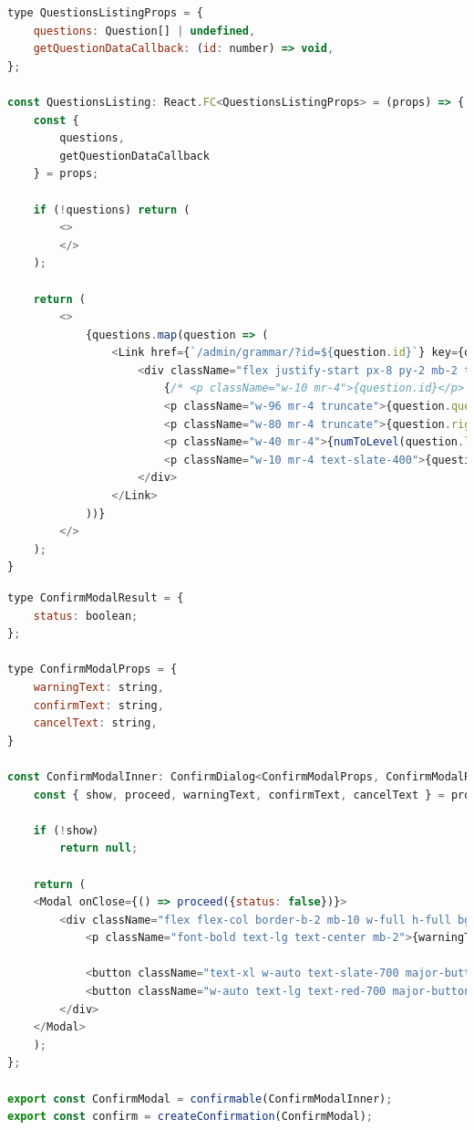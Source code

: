 \newpage
\begin{lstlisting}[language=JavaScript,caption={Úryvek z \M{/src/pages/admin/grammar/index.tsx}; generování seznamu otázek z databáze.}, label={xslxgen}]
type QuestionsListingProps = {
    questions: Question[] | undefined,
    getQuestionDataCallback: (id: number) => void,
};

const QuestionsListing: React.FC<QuestionsListingProps> = (props) => {
    const {
        questions,
        getQuestionDataCallback
    } = props;

    if (!questions) return (
        <>
        </>
    );

    return (
        <>
            {questions.map(question => (
                <Link href={`/admin/grammar/?id=${question.id}`} key={question.id} onClick={() => getQuestionDataCallback(question.id)}>
                    <div className="flex justify-start px-8 py-2 mb-2 text-left text-slate-700 hover:ring-2 ring-purple-600 rounded-3xl hover:cursor-pointer font-extrabold">
                        {/* <p className="w-10 mr-4">{question.id}</p> */}
                        <p className="w-96 mr-4 truncate">{question.questionText}</p>
                        <p className="w-80 mr-4 truncate">{question.rightAnswer}</p>
                        <p className="w-40 mr-4">{numToLevel(question.languageLevel)}</p>
                        <p className="w-10 mr-4 text-slate-400">{question.id}</p>
                    </div>
                </Link>
            ))}
        </>
    );
}
\end{lstlisting}

\pagebreak
\begin{lstlisting}[language=JavaScript,caption={Úryvek z \M{/src/components/admin/confirmModal.tsx}; potvrzovací modální okno.}, label={xslxgen}]
type ConfirmModalResult = {
    status: boolean;
};

type ConfirmModalProps = {
    warningText: string,
    confirmText: string,
    cancelText: string,
}

const ConfirmModalInner: ConfirmDialog<ConfirmModalProps, ConfirmModalResult> = (props) => {
    const { show, proceed, warningText, confirmText, cancelText } = props;

    if (!show)
        return null;

    return (
    <Modal onClose={() => proceed({status: false})}>
        <div className="flex flex-col border-b-2 mb-10 w-full h-full bg-purple-100 rounded-3xl p-10 px-14">
            <p className="font-bold text-lg text-center mb-2">{warningText}</p>

            <button className="text-xl w-auto text-slate-700 major-button my-3" onClick={() => proceed({status: false})}>{cancelText}</button>
            <button className="w-auto text-lg text-red-700 major-button" onClick={() => proceed({status: true})}>{confirmText}</button>
        </div>
    </Modal>
    );
};

export const ConfirmModal = confirmable(ConfirmModalInner);
export const confirm = createConfirmation(ConfirmModal);
\end{lstlisting}

